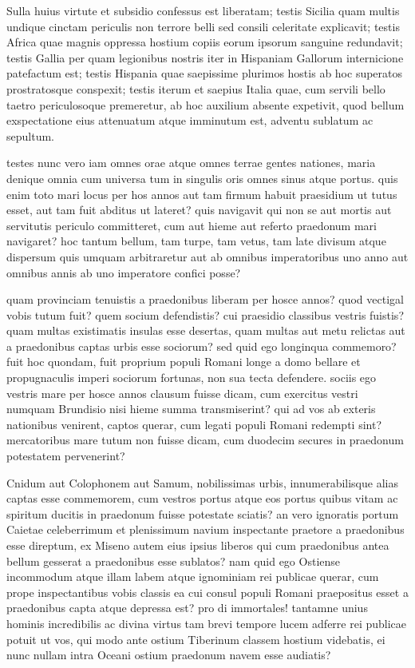  Sulla huius virtute et subsidio confessus est liberatam; testis Sicilia quam multis undique cinctam periculis non terrore belli sed consili celeritate explicavit; testis Africa quae magnis oppressa hostium copiis eorum ipsorum sanguine redundavit; testis Gallia per quam legionibus nostris iter in Hispaniam Gallorum internicione patefactum est; testis Hispania quae saepissime plurimos hostis ab hoc superatos prostratosque conspexit; testis iterum et saepius Italia quae, cum servili bello taetro periculosoque premeretur, ab hoc auxilium absente expetivit, quod bellum exspectatione eius attenuatum atque imminutum est, adventu sublatum ac sepultum.

 testes nunc vero iam omnes orae atque omnes terrae gentes nationes, maria denique omnia cum universa tum in singulis oris omnes sinus atque portus. quis enim toto mari locus per hos annos aut tam firmum habuit praesidium ut tutus esset, aut tam fuit abditus ut lateret? quis navigavit qui non se aut mortis aut servitutis periculo committeret, cum aut hieme aut referto praedonum mari navigaret? hoc tantum bellum, tam turpe, tam vetus, tam late divisum atque dispersum quis umquam arbitraretur aut ab omnibus imperatoribus uno anno aut omnibus annis ab uno imperatore confici posse?

 quam provinciam tenuistis a praedonibus liberam per hosce annos? quod vectigal vobis tutum fuit? quem socium defendistis? cui praesidio classibus vestris fuistis? quam multas existimatis insulas esse desertas, quam multas aut metu relictas aut a praedonibus captas urbis esse sociorum? sed quid ego longinqua commemoro? fuit hoc quondam, fuit proprium populi Romani longe a domo bellare et propugnaculis imperi sociorum fortunas, non sua tecta defendere. sociis ego vestris mare per hosce annos clausum fuisse dicam, cum exercitus vestri numquam Brundisio nisi hieme summa transmiserint? qui ad vos ab exteris nationibus venirent, captos querar, cum legati populi Romani redempti sint? mercatoribus mare tutum non fuisse dicam, cum duodecim secures in praedonum potestatem pervenerint?

 Cnidum aut Colophonem aut Samum, nobilissimas urbis, innumerabilisque alias captas esse commemorem, cum vestros portus atque eos portus quibus vitam ac spiritum ducitis in praedonum fuisse potestate sciatis? an vero ignoratis portum Caietae celeberrimum et plenissimum navium inspectante praetore a praedonibus esse direptum, ex Miseno autem eius ipsius liberos qui cum praedonibus antea bellum gesserat a praedonibus esse sublatos? nam quid ego Ostiense incommodum atque illam labem atque ignominiam rei publicae querar, cum prope inspectantibus vobis classis ea cui consul populi Romani praepositus esset a praedonibus capta atque depressa est? pro di immortales! tantamne unius hominis incredibilis ac divina virtus tam brevi tempore lucem adferre rei publicae potuit ut vos, qui modo ante ostium Tiberinum classem hostium videbatis, ei nunc nullam intra Oceani ostium praedonum navem esse audiatis?

